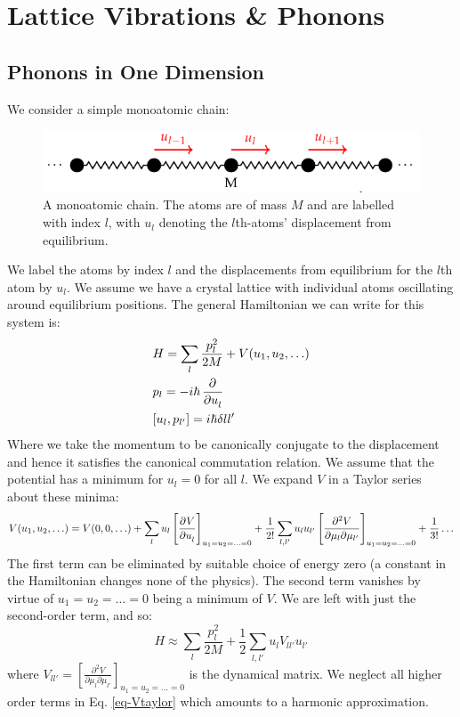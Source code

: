 \section{Lattice Vibrations \& Phonons}
\subsection{Phonons in One Dimension}
We consider a simple monoatomic chain:
\begin{figure}[htbp]
    \centering
    \includegraphics[]{Images/fig-monochaincartoon.pdf}

    \caption{A monoatomic chain. The atoms are of mass $M$ and are labelled with index $l$, with $u_l$ denoting the $l$th-atoms' displacement from equilibrium.}
    \label{fig-monochaincartoon}
\end{figure}
We label the atoms by index $l$ and the displacements from equilibrium for the $l$th atom by $u_l$. We assume we have a crystal lattice with individual atoms oscillating around equilibrium positions. The general Hamiltonian we can write for this system is:
\begin{equation}
    \begin{split}
        &H = \sum_l \frac{p_l^2}{2M} + V(u_1, u_2, \ldots)
        \\ &p_l = -i\hbar\dpd{}{u_l}
        \\ &[u_l, p_{l'}] = i\hbar\delta{ll'} 
    \end{split}
\end{equation}
Where we take the momentum to be canonically conjugate to the displacement and hence it satisfies the canonical commutation relation. We assume that the potential has a minimum for $u_l = 0$ for all $l$. We expand $V$ in a Taylor series about these minima:
\begin{equation}\label{eq-Vtaylor}
    V(u_1, u_2, \ldots) = V(0, 0, \ldots ) + \sum_l u_l \left[\dpd{V}{u_l}\right]_{u_1=u_2=\ldots = 0} + \frac{1}{2!}\sum_{l, l'}u_lu_{l'}\left[\frac{\partial^2 V}{\partial \mu_l \partial \mu_{l'}}\right]_{u_1=u_2=\ldots=0} + \frac{1}{3!} \ldots
\end{equation}
The first term can be eliminated by suitable choice of energy zero (a constant in the Hamiltonian changes none of the physics). The second term vanishes by virtue of $u_1 = u_2 = \ldots = 0$ being a minimum of $V$. We are left with just the second-order term, and so:
\begin{equation}
    H \approx \sum_l \frac{p_l^2}{2M} + \frac{1}{2}\sum_{l, l'}u_l V_{ll'}u_{l'}
\end{equation}
where $V_{ll'} = \left[\frac{\partial^2 V}{\partial \mu_l \partial \mu_{l'}}\right]_{u_1=u_2=\ldots=0}$ is the dynamical matrix. We neglect all higher order terms in Eq. \eqref{eq-Vtaylor} which amounts to a harmonic approximation.

